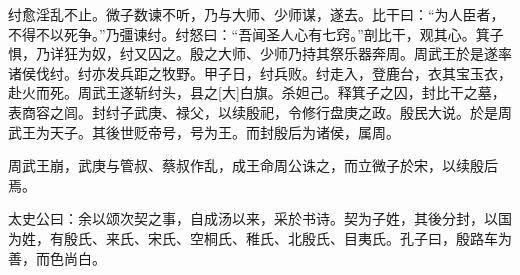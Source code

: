 \documentclass[UTF8,12pt,AutoFakeBold]{ctexart}
\begin{document}
纣愈淫乱不止。微子数谏不听，乃与大师、少师谋，遂去。比干曰：“为人臣者，不得不以死争。”乃彊谏纣。纣怒曰：“吾闻圣人心有七窍。”剖比干，观其心。箕子惧，乃详狂为奴，纣又囚之。殷之大师、少师乃持其祭乐器奔周。周武王於是遂率诸侯伐纣。纣亦发兵距之牧野。甲子日，纣兵败。纣走入，登鹿台，衣其宝玉衣，赴火而死。周武王遂斩纣头，县之[大]白旗。杀妲己。释箕子之囚，封比干之墓，表商容之闾。封纣子武庚、禄父，以续殷祀，令修行盘庚之政。殷民大说。於是周武王为天子。其後世贬帝号，号为王。而封殷后为诸侯，属周。

周武王崩，武庚与管叔、蔡叔作乱，成王命周公诛之，而立微子於宋，以续殷后焉。

太史公曰：余以颂次契之事，自成汤以来，采於书诗。契为子姓，其後分封，以国为姓，有殷氏、来氏、宋氏、空桐氏、稚氏、北殷氏、目夷氏。孔子曰，殷路车为善，而色尚白。


\pagebreak
{}%
\pagebreak
\end{document}
